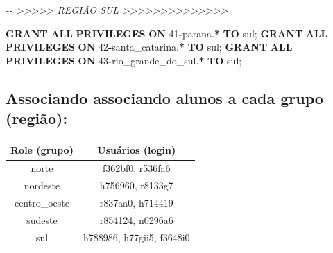 \documentclass[
]{book}
\newenvironment{Shaded}{\begin{snugshade}}{\end{snugshade}}
\newcommand{\CommentTok}[1]{\textcolor[rgb]{0.56,0.35,0.01}{\textit{#1}}}
\newcommand{\DecValTok}[1]{\textcolor[rgb]{0.00,0.00,0.81}{#1}}
\newcommand{\KeywordTok}[1]{\textcolor[rgb]{0.13,0.29,0.53}{\textbf{#1}}}
\newcommand{\NormalTok}[1]{#1}
\newcommand{\OperatorTok}[1]{\textcolor[rgb]{0.81,0.36,0.00}{\textbf{#1}}}
\newcommand{\StringTok}[1]{\textcolor[rgb]{0.31,0.60,0.02}{#1}}
\begin{document}
\begin{Shaded}
\begin{Highlighting}[]
\CommentTok{{-}{-} \textgreater{}\textgreater{}\textgreater{}\textgreater{}\textgreater{} REGIÃO SUL \textgreater{}\textgreater{}\textgreater{}\textgreater{}\textgreater{}\textgreater{}\textgreater{}\textgreater{}\textgreater{}\textgreater{}\textgreater{}\textgreater{}\textgreater{}\textgreater{}}

\KeywordTok{GRANT} \KeywordTok{ALL} \KeywordTok{PRIVILEGES} \KeywordTok{ON}\NormalTok{ \textasciigrave{}}\DecValTok{41}\OperatorTok{{-}}\NormalTok{parana\textasciigrave{}.}\OperatorTok{*}            \KeywordTok{TO} \StringTok{\textquotesingle{}sul\textquotesingle{}}\NormalTok{;}
\KeywordTok{GRANT} \KeywordTok{ALL} \KeywordTok{PRIVILEGES} \KeywordTok{ON}\NormalTok{ \textasciigrave{}}\DecValTok{42}\OperatorTok{{-}}\NormalTok{santa\_catarina\textasciigrave{}.}\OperatorTok{*}    \KeywordTok{TO} \StringTok{\textquotesingle{}sul\textquotesingle{}}\NormalTok{;}
\KeywordTok{GRANT} \KeywordTok{ALL} \KeywordTok{PRIVILEGES} \KeywordTok{ON}\NormalTok{ \textasciigrave{}}\DecValTok{43}\OperatorTok{{-}}\NormalTok{rio\_grande\_do\_sul\textasciigrave{}.}\OperatorTok{*} \KeywordTok{TO} \StringTok{\textquotesingle{}sul\textquotesingle{}}\NormalTok{;}
\end{Highlighting}
\end{Shaded}

\subsection{Associando associando alunos a cada grupo (região):}\label{associando-associando-alunos-a-cada-grupo-regiuxe3o}

\begin{longtable}[]{@{}cc@{}}
\toprule\noalign{}
Role (grupo) & Usuários (login) \\
\midrule\noalign{}
\endhead
\bottomrule\noalign{}
\endlastfoot
norte & f362bf0, r536fa6 \\
nordeste & h756960, r8133g7 \\
centro\_oeste & r837aa0, h714419 \\
sudeste & r854124, n0296a6 \\
sul & h788986, h77gii5, f3648i0 \\
\end{longtable}


\end{document}
